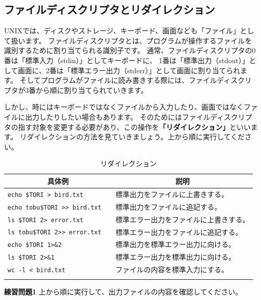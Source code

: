 \documentclass[a4j]{ltjreport}
\begin{document}
    \subsection{ファイルディスクリプタとリダイレクション}
    UNIXでは、ディスクやストレージ、キーボード、画面なども「ファイル」として扱います。
    ファイルディスクリプタとは、プログラムが操作するファイルを識別するために割り当てられる識別子です。
    通常、ファイルディスクリプタの0番は「標準入力（stdin）」としてキーボードに、
    1番は「標準出力（stdout）」として画面に、2番は「標準エラー出力（stderr）」として画面に割り当てられます。
    そしてプログラムがファイルに読み書きする際には、ファイルディスクリプタが3番から順に割り当てられていきます。

    しかし、時にはキーボードではなくファイルから入力したり、画面ではなくファイルに出力したりしたい場合もあります。
    そのためにはファイルディスクリプタの指す対象を変更する必要があり、この操作を\textbf{「リダイレクション」}といいます。
    リダイレクションの方法を見ていきましょう。上から順に実行してください。

    \begin{longtable}[c]{|l|l|}
        \hline
        \multicolumn{1}{|c|}{\textbf{具体例}}&\multicolumn{1}{|c|}{\textbf{説明}}\\
        \hline\hline
        \texttt{echo \$TORI > bird.txt} &標準出力をファイルに上書きする。\\
        \hline
        \texttt{echo tobu\$TORI >> bird.txt}　&標準出力をファイルに追記する。\\
        \hline
        \texttt{ls \$TORI 2> error.txt} &標準エラー出力をファイルに上書きする。\\
        \hline
        \texttt{ls tobu\$TORI 2>> error.txt} &標準エラー出力をファイルに追記する。\\
        \hline
        \texttt{echo \$TORI 1>\&2} &標準出力を標準エラー出力に向ける。\\
        \hline
        \texttt{ls \$TORI 2>\&1} &標準エラー出力を標準出力に向ける。\\
        \hline
        \texttt{wc -l < bird.txt} &ファイルの内容を標準入力にする。\\
        \hline
        \caption{リダイレクション}
    \end{longtable}
    \begin{itembox}[l]{\textbf{練習問題1}}
        上から順に実行して、出力ファイルの内容を確認してください。
    \end{itembox}
\end{document}

